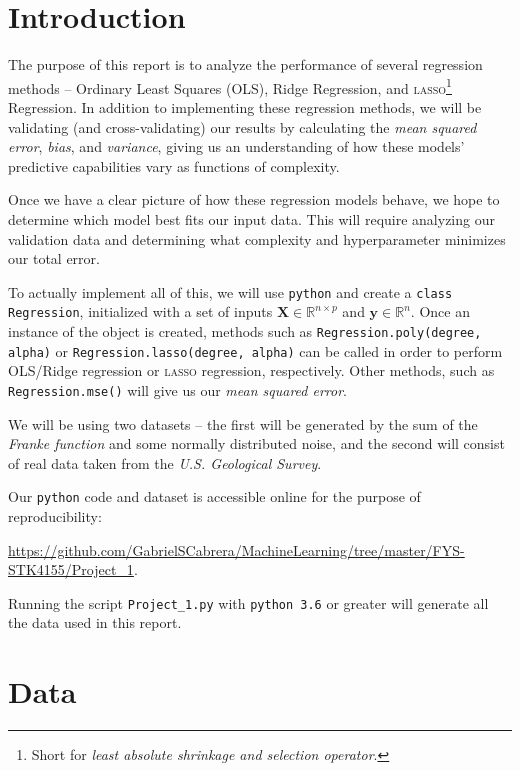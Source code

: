 \documentclass[a4paper,10pt,english]{article}
\begin{document}
\begin{multicols*}{2}

\section*{Introduction}
\label{sec:introduction}

The purpose of this report is to analyze the performance of several regression methods – Ordinary Least Squares (OLS), Ridge Regression, and \textsc{lasso}\footnote{Short for \textit{least absolute shrinkage and selection operator}.} Regression.  In addition to implementing these regression methods, we will be validating (and cross-validating) our results by calculating the \textit{mean squared error}, \textit{bias}, and \textit{variance}, giving us an understanding of how these models' predictive capabilities vary as functions of complexity.

Once we have a clear picture of how these regression models behave, we hope to determine which model best fits our input data.  This will require analyzing our validation data and determining what complexity and hyperparameter minimizes our total error.

To actually implement all of this, we will use \texttt{python} and create a \texttt{class Regression}, initialized with a set of inputs $\mathbf{X} \in \mathbb{R}^{n \times p}$ and $\mathbf{y} \in \mathbb{R}^n$.  Once an instance of the object is created, methods such as \texttt{Regression.poly(degree, alpha)} or \texttt{Regression.lasso(degree, alpha)} can be called in order to perform OLS/Ridge regression or \textsc{lasso} regression, respectively.  Other methods, such as \texttt{Regression.mse()} will give us our \textit{mean squared error}.

We will be using two datasets – the first will be generated by the sum of the \textit{Franke function} and some normally distributed noise, and the second will consist of real data taken from the \textit{U.S. Geological Survey}.

Our \texttt{python} code and dataset is accessible online for the purpose of reproducibility:

\url{https://github.com/GabrielSCabrera/MachineLearning/tree/master/FYS-STK4155/Project_1}.

Running the script \texttt{Project\_1.py} with \texttt{python 3.6} or greater will generate all the data used in this report.

\section*{Data}
\label{sec:data}


\end{multicols*}
\end{document}
